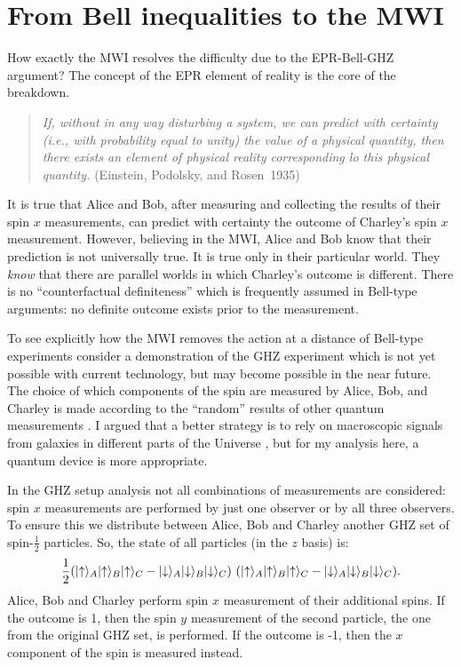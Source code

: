 \documentclass[11pt]{article}
\begin{document}
\section{From Bell inequalities to the MWI }

How exactly the MWI resolves the difficulty due to the EPR-Bell-GHZ argument? The concept of the EPR element of reality is the core of the breakdown.
\begin{quote}
{\it   If, without in any way disturbing a system, we can predict with certainty (i.e., with
probability equal to unity) the value of a physical quantity, then there exists an element of physical reality corresponding lo this physical quantity.}
\flushright
 (Einstein, Podolsky, and Rosen~1935)
\end{quote}
 It is true that Alice and Bob, after measuring and collecting the results of their  spin $x$ measurements, can predict with certainty the outcome of Charley's spin $x$ measurement. However,  believing in the MWI, Alice and Bob know that their prediction is not universally true. It is true only in their particular world. They {\it know} that there are  parallel worlds in which Charley's outcome is different. There is  no ``counterfactual definiteness'' which is frequently assumed in Bell-type arguments: no definite outcome   exists  prior to the measurement.


To see explicitly how the MWI removes the action at a distance of Bell-type experiments consider a demonstration of the GHZ experiment which is not yet possible with current technology, but may become possible in the near future. The choice of which components of the spin are measured  by Alice, Bob, and Charley  is made according to the ``random''  results of other quantum measurements \cite{Sheid}.   I argued that a better strategy is to rely  on macroscopic signals from galaxies in different parts of the Universe \cite{VBell}, but for my analysis here, a quantum device is more appropriate.

In the GHZ setup analysis not all combinations of measurements are considered: spin $x$ measurements are performed by just one  observer or by all three observers. To ensure this we distribute between Alice, Bob and Charley another GHZ set of  spin-$\frac{1}{2}$ particles. So, the state of all particles  (in the $z$ basis) is:
\begin{equation}
\label{GHZ+}
  {1\over
  2}{\Large (}|{\uparrow}\rangle_A|{\uparrow}\rangle_B|{\uparrow}\rangle_C -
|{\downarrow}\rangle_A|{\downarrow}\rangle_B|{\downarrow}\rangle_C{\Large
)}~{\Large (}|{\uparrow}\rangle_A|{\uparrow}\rangle_B|{\uparrow}\rangle_C -
|{\downarrow}\rangle_A|{\downarrow}\rangle_B|{\downarrow}\rangle_C{\Large
)} .
\end{equation}
Alice, Bob and Charley perform spin $x$ measurement of their additional spins. If the outcome is 1,  then the spin $y$ measurement of the second particle, the one from the original GHZ set, is performed. If the outcome is -1, then the   $x$ component of the spin is measured instead.
\end{document}
